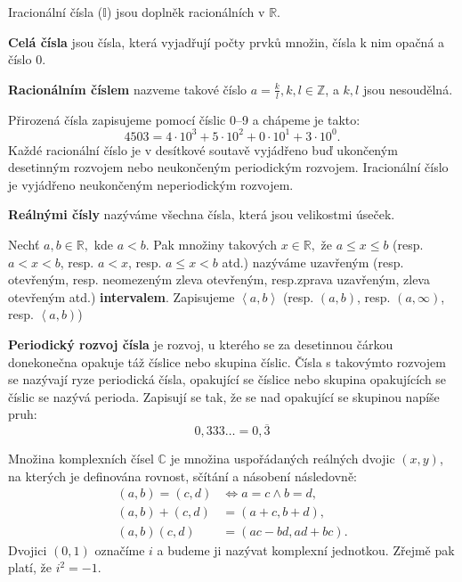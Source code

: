 Iracionální čísla ($\mathbb{I}$) jsou doplněk racionálních v $\mathbb{R}$.

\begin{definition}
  \textbf{Celá čísla} jsou čísla, která vyjadřují počty prvků množin, čísla k nim opačná a číslo 0.
\end{definition}

\begin{definition}
  \textbf{Racionálním číslem} nazveme takové číslo $a = \frac{k}{l}, k, l \in \mathbb{Z}$, a $k,l$ jsou nesoudělná.
\end{definition}

\begin{pozn}
  Přirozená čísla zapisujeme pomocí číslic 0--9 a chápeme je takto:
  $$4503=4\cdot 10^3+5\cdot 10^2 + 0 \cdot 10^1 + 3\cdot 10^0.$$
  Každé racionální číslo je v desítkové soutavě vyjádřeno buď ukončeným desetinným rozvojem nebo neukončeným periodickým rozvojem. Iracionální číslo je vyjádřeno neukončeným neperiodickým rozvojem.
\end{pozn}

\begin{definition}
  \textbf{Reálnými čísly} nazýváme všechna čísla, která jsou velikostmi úseček.
\end{definition}

\begin{definition}
  Nechť $a,b \in \mathbb{R},$ kde $a<b$. Pak množiny takových $x\in \mathbb{R},$ že $a\leq x\leq b$ (resp. $a < x < b$, resp. $a < x$, resp. $a \leq x < b$ atd.) nazýváme uzavřeným (resp. otevřeným, resp. neomezeným zleva otevřeným, resp.zprava uzavřeným, zleva otevřeným atd.) \textbf{intervalem}. Zapisujeme $\left<a,b\right>$ (resp. $\left(a,b\right)$, resp. $(a, \infty)$, resp. $\left<a, b\right)$)
\end{definition}

\begin{definition}
  \textbf{Periodický rozvoj čísla} je rozvoj, u kterého se za desetinnou čárkou donekonečna opakuje táž číslice nebo skupina číslic. Čísla s takovýmto rozvojem se nazývají ryze periodická čísla, opakující se číslice nebo skupina opakujících se číslic se nazývá perioda. Zapisují se tak, že se nad opakující se skupinou napíše pruh:
  $$0,333 … = 0,\overline{3}$$
\end{definition}

\begin{definition}
  Množina komplexních čísel $\mathbb C$ je množina uspořádaných reálných dvojic $(x, y)$, na kterých je definována rovnost, sčítání a násobení následovně:
  \begin{align*}
    (a, b) = (c, d) & \iff a = c \land b = d, \\
    (a, b) + (c, d) & = (a + c, b + d), \\
    (a, b)(c, d) & = (ac - bd, ad + bc).
  \end{align*}
  Dvojici $(0, 1)$ označíme $i$ a budeme ji nazývat komplexní jednotkou. Zřejmě pak platí, že $i^2 = -1$.
\end{definition}

